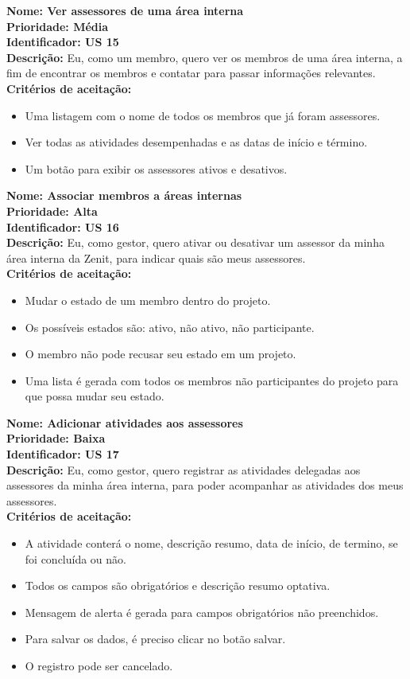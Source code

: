 \begin{anexosenv}
\indent \textbf{Nome: Ver assessores de uma área interna\\
\indent Prioridade: Média\\
\indent Identificador: US 15\\
\indent Descrição:} Eu, como um membro, quero ver os membros de uma área interna, a fim de encontrar os membros e contatar para passar informações relevantes.\\
\indent \textbf{Critérios de aceitação:}
\begin{itemize}
    \item Uma listagem com o nome de todos os membros que já foram assessores.
    \item Ver todas as atividades desempenhadas e as datas de início e término.
    \item Um botão para exibir os assessores ativos e desativos.
\end{itemize}

\indent \textbf{Nome: Associar membros a áreas internas\\
\indent Prioridade: Alta\\
\indent Identificador: US 16\\
\indent Descrição: }Eu, como gestor, quero ativar ou desativar um assessor da minha área interna da Zenit, para indicar quais são meus assessores.\\
\indent \textbf{Critérios de aceitação:}
\begin{itemize}
    \item Mudar o estado de um membro dentro do projeto.
    \item Os possíveis estados são: ativo, não ativo, não participante.
    \item O membro não pode recusar seu estado em um projeto.
    \item Uma lista é gerada com todos os membros não participantes do projeto para que possa mudar seu estado.
\end{itemize}

\indent \textbf{Nome: Adicionar atividades aos assessores\\
\indent Prioridade: Baixa\\
\indent Identificador: US 17\\
\indent Descrição:} Eu, como gestor, quero registrar as atividades delegadas aos assessores da minha área interna, para poder acompanhar as atividades dos meus assessores.\\
\indent \textbf{Critérios de aceitação:}
\begin{itemize}
    \item A atividade conterá o nome, descrição resumo, data de início, de termino, se foi concluída ou não.
    \item Todos os campos são obrigatórios e descrição resumo optativa.
    \item Mensagem de alerta é gerada para campos obrigatórios não preenchidos.
    \item Para salvar os dados, é preciso clicar no botão salvar.
    \item O registro pode ser cancelado.
\end{itemize}


\end{anexosenv}
